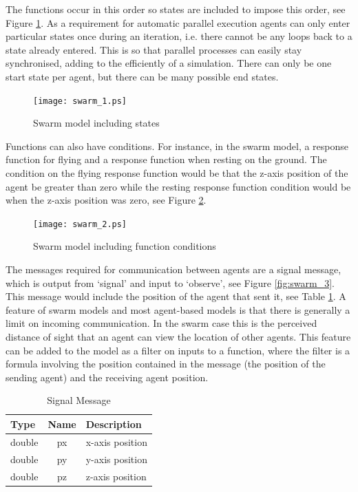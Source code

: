 The functions occur in this order so states are included to impose this
order, see Figure \ref{fig:swarm_1}. As a requirement for automatic parallel
execution agents can only enter particular states once during an iteration,
i.e. there cannot be any loops back to a state already entered. This is so that
parallel processes can easily stay synchronised, adding to the efficiently of a
simulation. There can only be one start state per agent, but there can be many
possible end states.

\begin{figure}[ht]
\begin{center}
\texttt{[image: swarm\_1.ps]}
\caption{Swarm model including states}
\label{fig:swarm_1}
\end{center}
\end{figure}

Functions can also have conditions. For instance, in
the swarm model, a response function for flying and a response function when
resting on the ground. The condition on the flying response function would be that the
z-axis position of the agent be greater than zero while the resting response
function condition would be when the z-axis position was zero, see Figure
\ref{fig:swarm_2}.

\begin{figure}[ht]
\begin{center}
\texttt{[image: swarm\_2.ps]}
\caption{Swarm model including function conditions}
\label{fig:swarm_2}
\end{center}
\end{figure}

The messages required for communication between agents are a signal message,
which is output from `signal' and input to `observe', see Figure
\ref{fig:swarm_3}. This message would include the position of the agent that
sent it, see Table \ref{tab:signal_message}. A feature of swarm models and most
agent-based models is that there is generally a limit on incoming communication. 
In the swarm case this is the perceived distance of sight that an agent can view the location of other
agents. This feature can be added to the model as a filter on inputs to a
function, where the filter is a formula involving the position contained in the
message (the position of the sending agent) and the receiving agent position.

\begin{table}[ht]
\centering
\begin{tabular}{|l||c||l|}
\hline
Type&Name&Description\\
\hline \hline
double&px&x-axis position\\
\hline
double&py&y-axis position\\
\hline
double&pz&z-axis position\\
\hline
\end{tabular}
\caption{Signal Message}
\label{tab:signal_message}
\end{table}

